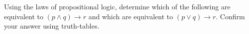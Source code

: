 \documentclass[]{exam}
\begin{document}
  \begin{center}
  \end{center}

  \begin{questions}
    \question Using the laws of propositional logic, determine which of the
      following are equivalent to $(p \land q) \rightarrow r$ and which are
      equivalent to $(p \lor q) \rightarrow r$. Confirm your answer using
      truth-tables.


      \ifprintanswers\else
      \fi


\end{questions}
\end{document}
